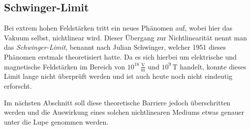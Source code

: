 

\subsection{Schwinger-Limit}
Bei extrem hohen Feldstärken tritt ein neues Phänomen auf, 
wobei hier das Vakuum selbst, nichtlinear wird.
Dieser Übergang zur Nichtlinearität nennt man das \emph{Schwinger-Limit}, 
benannt nach Julian Schwinger, welcher 1951 dieses Phänomen erstmals theoretisiert hatte.
Da es sich hierbei um elektrische und magnetische Feldstärken im Bereich von $10^{18}\,\frac{\text{V}}{\text{m}}$ und $10^9\,\text{T}$ handelt,
konnte dieses Limit lange nicht überprüft werden und ist auch heute noch nicht eindeutig erforscht.

Im nächsten Abschnitt soll diese theoretische Barriere jedoch überschritten werden und 
die Auswirkung eines solchen nichtlinearen Mediums etwas genauer unter die Lupe genommen werden.




